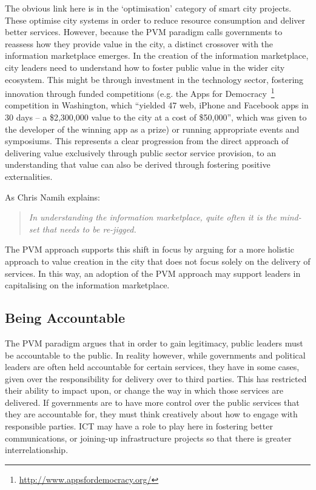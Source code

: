 \documentclass[conference]{IEEEtran}
\begin{document}
The obvious link here is in the `optimisation' category of smart city
projects. These optimise city systems in order to reduce resource
consumption and deliver better services. However, because the PVM
paradigm calls governments to reassess how they provide value in the
city, a distinct crossover with the information marketplace
emerges. In the creation of the information marketplace, city leaders
need to understand how to foster public value in the wider city
ecosystem. This might be through investment in the technology sector,
fostering innovation through funded competitions (e.g. the Apps for
Democracy~\footnote{\url{http://www.appsfordemocracy.org/}}
competition in Washington, which ``yielded 47 web, iPhone and Facebook
apps in 30 days -- a \$2,300,000 value to the city at a cost of
\$50,000'', which was given to the developer of the winning app as a
prize) or running appropriate events and symposiums. This represents a
clear progression from the direct approach of delivering value
exclusively through public sector service provision, to an
understanding that value can also be derived through fostering
positive externalities.

As Chris Namih explains:

\begin{quote}
{\emph{In understanding the information marketplace, quite often it is the
mind-set that needs to be re-jigged.}}~\cite{namih:2012}
\end{quote}

The PVM approach supports this shift in focus by arguing for a more
holistic approach to value creation in the city that does not focus
solely on the delivery of services. In this way, an adoption of the
PVM approach may support leaders in capitalising on the information
marketplace.

\subsection{Being Accountable}
The PVM paradigm argues that in order to gain legitimacy, public
leaders must be accountable to the public. In reality however, while
governments and political leaders are often held accountable for
certain services, they have in some cases, given over the
responsibility for delivery over to third parties. This has restricted
their ability to impact upon, or change the way in which those
services are delivered. If governments are to have more control over
the public services that they are accountable for, they must think
creatively about how to engage with responsible parties. ICT may have
a role to play here in fostering better communications, or joining-up
infrastructure projects so that there is greater interrelationship.
\end{document}
